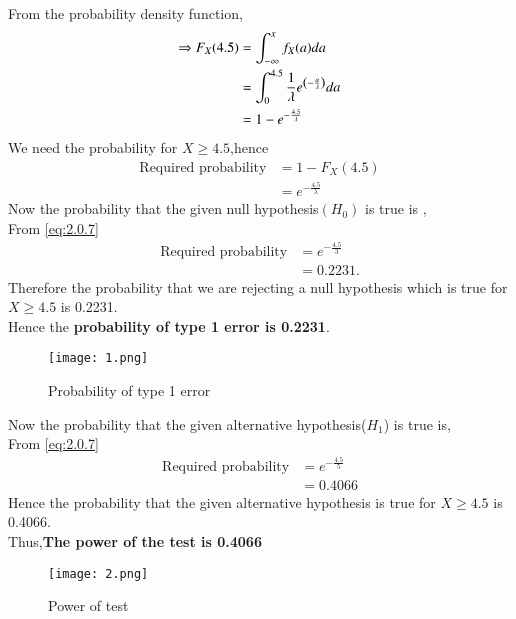 \documentclass[journal,12pt,twocolumn]{IEEEtran}
\begin{document}
From the probability density function,
\begin{align}
    \Rightarrow F_X(4.5)&=\int_{-\infty}^{x}f_{X}(a) da\\
    &=\int_{0}^{4.5}\frac{1}{\lambda}e^{\left(-\frac{a}{\lambda}\right)}da\\
    &=1-e^{-\frac{4.5}{\lambda}}
\end{align}
We need the probability for $X\geq 4.5$,hence\\
\begin{align}
\text{Required probability}&=1-F_{X}(4.5)\\
&=e^{-\frac{4.5}{\lambda}}\label{eq:2.0.7}
\end{align}
Now the probability that the given null hypothesis$(H_{0})$ is true is ,\\
From \eqref{eq:2.0.7}
\begin{align}
    \text{Required probability} &=e^{-\frac{4.5}{3}}\\
    &=0.2231.
\end{align}
Therefore the probability that we are rejecting a null hypothesis which is true for $X \geq 4.5$ is 0.2231.\\
Hence the \textbf{probability of type 1 error is 0.2231}.\\
\begin{figure}[H]
    \centering
    \texttt{[image: 1.png]}
    \caption{Probability of type 1 error}
\end{figure}
Now the probability that the given alternative hypothesis($H_{1}$) is true is,\\
From \eqref{eq:2.0.7}
\begin{align}
\text{Required probability}&=e^{-\frac{4.5}{5}}\\
    &=0.4066
\end{align}
Hence the probability that the given alternative hypothesis is true for $X \geq 4.5$ is 0.4066.\\
Thus,\textbf{The power of the test is 0.4066}
\begin{figure}[H]
    \centering
    \texttt{[image: 2.png]}
    \caption{Power of test}
\end{figure}
\end{document}
